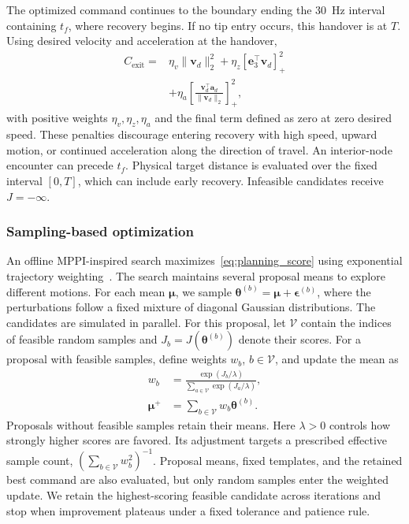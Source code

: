 \documentclass[letterpaper, 10 pt, conference]{ieeeconf}
\begin{document}
The optimized command continues to the boundary ending the
30~Hz interval containing $t_f$, where recovery begins.
If no tip entry occurs, this handover is at $T$.
Using desired velocity and acceleration at the handover,
\begin{equation}
\begin{aligned}
C_{\mathrm{exit}}
={}&\eta_v\|\mathbf v_d\|_2^2
  +\eta_z[\mathbf e_3^\top\mathbf v_d]_+^2\\
&+\eta_a\left[
  \frac{\mathbf v_d^\top\mathbf a_d}{\|\mathbf v_d\|_2}
  \right]_+^2,
\end{aligned}
\label{eq:exit_cost}
\end{equation}
with positive weights $\eta_v,\eta_z,\eta_a$ and the final
term defined as zero at zero desired speed. These penalties
discourage entering recovery with high speed, upward motion,
or continued acceleration along the direction of travel.
An interior-node encounter can precede $t_f$. Physical target
distance is evaluated over the fixed interval $[0,T]$, which
can include early recovery. Infeasible candidates receive
$J=-\infty$.

\subsubsection{Sampling-based optimization}
An offline MPPI-inspired search maximizes~\eqref{eq:planning_score}
using exponential trajectory weighting~\cite{williams2017model}.
The search maintains several proposal means to explore different
motions. For each mean $\boldsymbol\mu$, we sample
$\boldsymbol\theta^{(b)}=\boldsymbol\mu+
\boldsymbol\epsilon^{(b)}$, where the perturbations follow
a fixed mixture of diagonal Gaussian distributions.
The candidates are simulated in parallel.
For this proposal, let $\mathcal V$ contain the indices of feasible
random samples and $J_b=J(\boldsymbol\theta^{(b)})$ denote their scores.
For a proposal with feasible samples, define weights $w_b$,
$b\in\mathcal V$, and update the mean as
\begin{equation}
\begin{aligned}
w_b&=\frac{\exp(J_b/\lambda)}
{\sum_{a\in\mathcal V}\exp(J_a/\lambda)},\\
\boldsymbol\mu^{+}
&=\sum_{b\in\mathcal V}w_b\boldsymbol\theta^{(b)}.
\end{aligned}
\label{eq:offline_sampling_update}
\end{equation}
Proposals without feasible samples retain their means.
Here $\lambda>0$ controls how strongly higher scores are
favored. Its adjustment targets a prescribed effective sample
count, $(\sum_{b\in\mathcal V}w_b^2)^{-1}$.
Proposal means, fixed templates, and the retained best command
are also evaluated, but only random samples enter the weighted
update. We retain the highest-scoring feasible candidate across
iterations and stop when improvement plateaus under a fixed
tolerance and patience rule.
\end{document}
